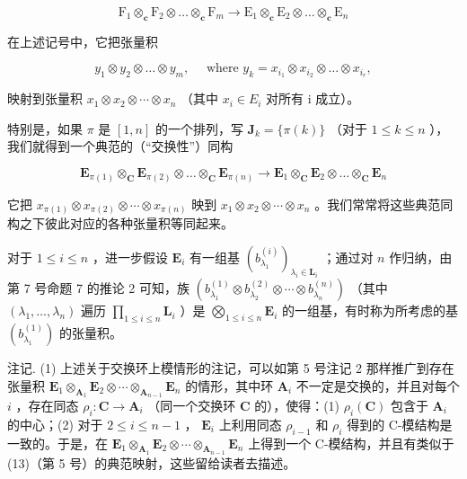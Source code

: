 \[
\mathrm{F} _ {1} \otimes_ {\mathbf {c}} \mathrm{F} _ {2} \otimes \dots \otimes_ {\mathbf {c}} \mathrm{F} _ {m} \rightarrow \mathrm{E} _ {1} \otimes_ {\mathbf {c}} \mathrm{E} _ {2} \otimes \dots \otimes_ {\mathbf {c}} \mathrm{E} _ {n}
\]

在上述记号中，它把张量积

\[
y _ {1} \otimes y _ {2} \otimes \dots \otimes y _ {m}, \quad \text { where } y _ {k} = x _ {i _ {1}} \otimes x _ {i _ {2}} \otimes \dots \otimes x _ {i _ {r}},
\]

映射到张量积 \(x_{1} \otimes x_{2} \otimes \cdots \otimes x_{n}\) （其中 \(x_{i} \in E_{i}\) 对所有 i 成立）。

特别是，如果 \(\pi\) 是 \([1, n]\) 的一个排列，写 \(\mathbf{J}_k = \{\pi(k)\}\) （对于 \(1 \leqslant k \leqslant n\) ），我们就得到一个典范的（“交换性”）同构

\[
\mathbf {E} _ {\pi (1)} \otimes_ {\mathbf {C}} \mathbf {E} _ {\pi (2)} \otimes \dots \otimes_ {\mathbf {C}} \mathbf {E} _ {\pi (n)} \rightarrow \mathbf {E} _ {1} \otimes_ {\mathbf {C}} \mathbf {E} _ {2} \otimes \dots \otimes_ {\mathbf {C}} \mathbf {E} _ {n}
\]

它把 \(x_{\pi(1)} \otimes x_{\pi(2)} \otimes \cdots \otimes x_{\pi(n)}\) 映到 \(x_{1} \otimes x_{2} \otimes \cdots \otimes x_{n}\) 。我们常常将这些典范同构之下彼此对应的各种张量积等同起来。

对于 \(1 \leqslant i \leqslant n\) ，进一步假设 \(\mathbf{E}_i\) 有一组基 \((b_{\lambda_1}^{(i)})_{\lambda_i \in \mathbf{L}_i}\) ；通过对 \(n\) 作归纳，由第 7 号命题 7 的推论 2 可知，族 \((b_{\lambda_1}^{(1)} \otimes b_{\lambda_2}^{(2)} \otimes \cdots \otimes b_{\lambda_n}^{(n)})\) （其中 \((\lambda_1, \ldots, \lambda_n)\) 遍历 \(\prod_{1 \leqslant i \leqslant n} \mathbf{L}_i\) ）是 \(\bigotimes_{1 \leqslant i \leqslant n} \mathbf{E}_i\) 的一组基，有时称为所考虑的基 \((b_{\lambda_1}^{(1)})\) 的张量积。

注记. (1) 上述关于交换环上模情形的注记，可以如第 5 号注记 2 那样推广到存在张量积 \(\mathbf{E}_1 \otimes_{\mathbf{A}_1} \mathbf{E}_2 \otimes \cdots \otimes_{\mathbf{A}_{n-1}} \mathbf{E}_n\) 的情形，其中环 \(\mathbf{A}_i\) 不一定是交换的，并且对每个 \(i\) ，存在同态 \(\rho_i: \mathbf{C} \to \mathbf{A}_i\) （同一个交换环 \(\mathbf{C}\) 的），使得：(1) \(\rho_i(\mathbf{C})\) 包含于 \(\mathbf{A}_i\) 的中心；(2) 对于 \(2 \leqslant i \leqslant n - 1\) ， \(\mathbf{E}_i\) 上利用同态 \(\rho_{i-1}\) 和 \(\rho_i\) 得到的 C-模结构是一致的。于是，在 \(\mathbf{E}_1 \otimes_{\mathbf{A}_1} \mathbf{E}_2 \otimes \cdots \otimes_{\mathbf{A}_{n-1}} \mathbf{E}_n\) 上得到一个 C-模结构，并且有类似于 (13)（第 5 号）的典范映射，这些留给读者去描述。

